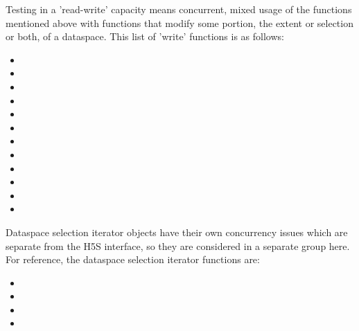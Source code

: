 \documentclass[../HDF5_RFC.tex]{subfiles}
\begin{document}
Testing in a 'read-write' capacity means concurrent, mixed usage of the functions mentioned above with
functions that modify some portion, the extent or selection or both, of a dataspace. This list of
'write' functions is as follows:

\begin{itemize}
    \item {}
    \item {}
    \item {}
    \item {}
    \item {}
    \item {}
    \item {}
    \item {}
    \item {}
    \item {}
    \item {}
    \item {}
\end{itemize}

Dataspace selection iterator objects have their own concurrency issues which are separate from the H5S
interface, so they are considered in a separate group here. For reference, the dataspace selection iterator
functions are:

\begin{itemize}
    \item {}
    \item {}
    \item {}
    \item {}
\end{itemize}
\end{document}

